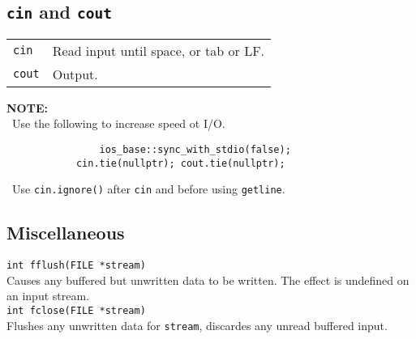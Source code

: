 \subsection{\texttt{cin} and \texttt{cout}}

	\begin{tabularx}{\linewidth}{lX}
		\texttt{cin} & Read input until space, or tab or LF.\\
		\texttt{cout} & Output.\\
	\end{tabularx}
\vspace{-8pt}
	\begin{mdframed}[backgroundcolor=blue!20]
		\textbf{NOTE:}\\
			\textbullet\ Use the following to increase speed ot I/O.
\vspace{-8pt}
			\begin{verbatim}
				ios_base::sync_with_stdio(false);
			cin.tie(nullptr); cout.tie(nullptr);	
		\end{verbatim}
\vspace{-8pt}
		\textbullet\ Use \texttt{cin.ignore()} after \texttt{cin} and before using \texttt{getline}.
	\end{mdframed}

\subsection{Miscellaneous}

\texttt{int fflush(FILE *stream)}\\
Causes any buffered but unwritten data to be written. The effect is undefined on an input stream.\\
\texttt{int fclose(FILE *stream)}\\
Flushes any unwritten data for \texttt{stream}, discardes any unread buffered input.

\vfill\null
\columnbreak


